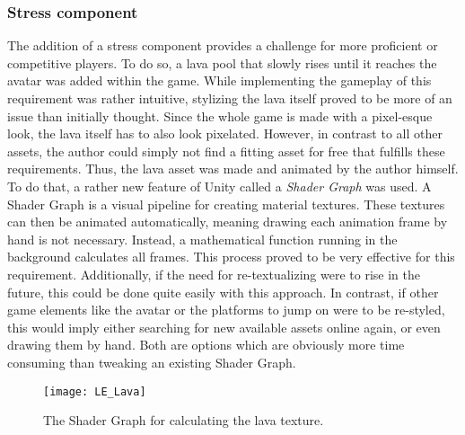 \documentclass[draft,final]{vutinfth} %
\begin{document}
\subsubsection{Stress component}
The addition of a stress component provides a challenge for more proficient or competitive players. To do so, a lava pool that slowly rises until it reaches the avatar was added within the game. While implementing the gameplay of this requirement was rather intuitive, stylizing the lava itself proved to be more of an issue than initially thought. Since the whole game is made with a pixel-esque look, the lava itself has to also look pixelated. However, in contrast to all other assets, the author could simply not find a fitting asset for free that fulfills these requirements. Thus, the lava asset was made and animated by the author himself. To do that, a rather new feature of Unity called a \emph{Shader Graph} was used. A Shader Graph is a visual pipeline for creating material textures. These textures can then be animated automatically, meaning drawing each animation frame by hand is not necessary. Instead, a mathematical function running in the background calculates all frames. This process proved to be very effective for this requirement. Additionally, if the need for re-textualizing were to rise in the future, this could be done quite easily with this approach. In contrast, if other game elements like the avatar or the platforms to jump on were to be re-styled, this would imply either searching for new available assets online again, or even drawing them by hand. Both are options which are obviously more time consuming than tweaking an existing Shader Graph.


\begin{figure}
\begin{center}
\texttt{[image: LE\_Lava]}
\end{center}
\caption{The Shader Graph for calculating the lava texture.}
\end{figure}
\end{document}
